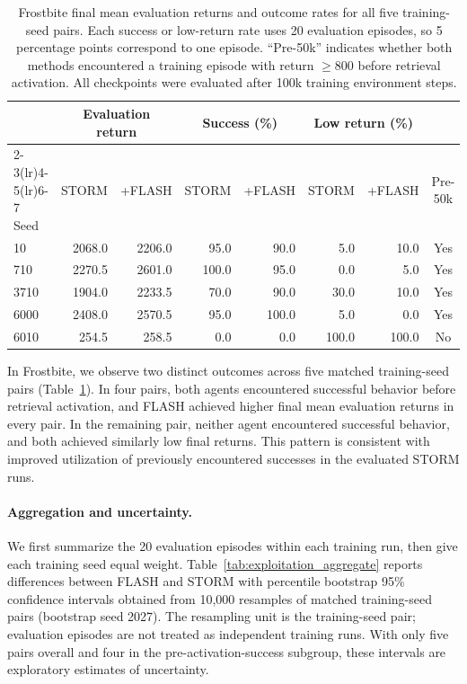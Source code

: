 \documentclass{article} %
\begin{document}
\begin{table}[!htbp]
\centering
\caption{Frostbite final mean evaluation returns and outcome rates for all five training-seed pairs. Each success or low-return rate uses 20 evaluation episodes, so 5 percentage points correspond to one episode. ``Pre-50k'' indicates whether both methods encountered a training episode with return $\geq 800$ before retrieval activation. All checkpoints were evaluated after 100k training environment steps.}
\label{tab:exploitation_seeds}
\small
\setlength{\tabcolsep}{4pt}
\renewcommand{\arraystretch}{1.12}
\begin{tabular*}{\textwidth}{@{\extracolsep{\fill}}lrrrrrrc@{}}
\toprule
& \multicolumn{2}{c}{Evaluation return} & \multicolumn{2}{c}{Success (\%)} & \multicolumn{2}{c}{Low return (\%)} & \\
\cmidrule(lr){2-3}\cmidrule(lr){4-5}\cmidrule(lr){6-7}
Seed & STORM & +FLASH & STORM & +FLASH & STORM & +FLASH & Pre-50k \\
\midrule
10   & 2068.0 & 2206.0 & 95.0  & 90.0  & 5.0   & 10.0  & Yes \\
710  & 2270.5 & 2601.0 & 100.0 & 95.0  & 0.0   & 5.0   & Yes \\
3710 & 1904.0 & 2233.5 & 70.0  & 90.0  & 30.0  & 10.0  & Yes \\
6000 & 2408.0 & 2570.5 & 95.0  & 100.0 & 5.0   & 0.0   & Yes \\
6010 & 254.5  & 258.5  & 0.0   & 0.0   & 100.0 & 100.0 & No \\
\bottomrule
\end{tabular*}
\end{table}
\FloatBarrier

In Frostbite, we observe two distinct outcomes across five matched training-seed pairs (Table~\ref{tab:exploitation_seeds}). In four pairs, both agents encountered successful behavior before retrieval activation, and FLASH achieved higher final mean evaluation returns in every pair. In the remaining pair, neither agent encountered successful behavior, and both achieved similarly low final returns. This pattern is consistent with improved utilization of previously encountered successes in the evaluated STORM runs.

\paragraph{Aggregation and uncertainty.}
We first summarize the 20 evaluation episodes within each training run, then give each training seed equal weight. Table~\ref{tab:exploitation_aggregate} reports differences between FLASH and STORM with percentile bootstrap 95\% confidence intervals obtained from 10,000 resamples of matched training-seed pairs (bootstrap seed 2027). The resampling unit is the training-seed pair; evaluation episodes are not treated as independent training runs. With only five pairs overall and four in the pre-activation-success subgroup, these intervals are exploratory estimates of uncertainty.
\end{document}
